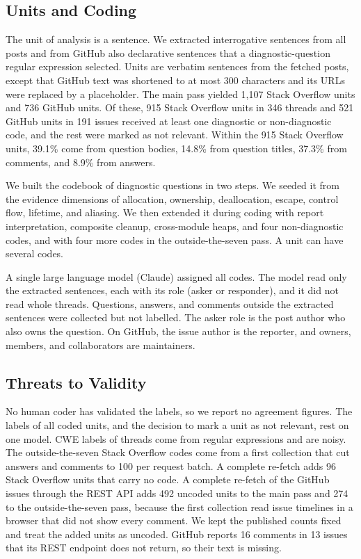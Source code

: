 \subsection{Units and Coding}
The unit of analysis is a sentence.
We extracted interrogative sentences from all posts and from GitHub also declarative sentences that a diagnostic-question regular expression selected.
Units are verbatim sentences from the fetched posts, except that GitHub text was shortened to at most 300 characters and its URLs were replaced by a placeholder.
The main pass yielded 1{,}107 Stack Overflow units and 736 GitHub units.
Of these, 915 Stack Overflow units in 346 threads and 521 GitHub units in 191 issues received at least one diagnostic or non-diagnostic code, and the rest were marked as not relevant.
Within the 915 Stack Overflow units, 39.1\% come from question bodies, 14.8\% from question titles, 37.3\% from comments, and 8.9\% from answers.

We built the codebook of diagnostic questions in two steps.
We seeded it from the evidence dimensions of allocation, ownership, deallocation, escape, control flow, lifetime, and aliasing.
We then extended it during coding with report interpretation, composite cleanup, cross-module heaps, and four non-diagnostic codes, and with four more codes in the outside-the-seven pass.
A unit can have several codes.

A single large language model (Claude) assigned all codes.
The model read only the extracted sentences, each with its role (asker or responder), and it did not read whole threads.
Questions, answers, and comments outside the extracted sentences were collected but not labelled.
The asker role is the post author who also owns the question.
On GitHub, the issue author is the reporter, and owners, members, and collaborators are maintainers.

\subsection{Threats to Validity}
No human coder has validated the labels, so we report no agreement figures.
The labels of all coded units, and the decision to mark a unit as not relevant, rest on one model.
CWE labels of threads come from regular expressions and are noisy.
The outside-the-seven Stack Overflow codes come from a first collection that cut answers and comments to 100 per request batch.
A complete re-fetch adds 96 Stack Overflow units that carry no code.
A complete re-fetch of the GitHub issues through the REST API adds 492 uncoded units to the main pass and 274 to the outside-the-seven pass, because the first collection read issue timelines in a browser that did not show every comment.
We kept the published counts fixed and treat the added units as uncoded.
GitHub reports 16 comments in 13 issues that its REST endpoint does not return, so their text is missing.
